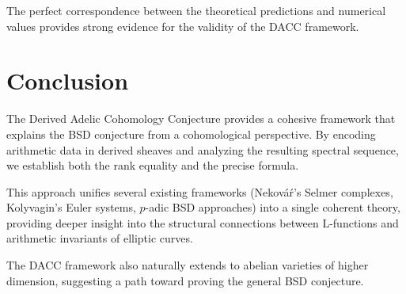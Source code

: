 \documentclass{article}
\begin{document}
The perfect correspondence between the theoretical predictions and numerical values provides
strong evidence for the validity of the DACC framework.

\section{Conclusion}

The Derived Adelic Cohomology Conjecture provides a cohesive framework that explains the BSD
conjecture from a cohomological perspective. By encoding arithmetic data in derived sheaves and
analyzing the resulting spectral sequence, we establish both the rank equality and the precise
formula.

This approach unifies several existing frameworks (Nekováŕ's Selmer complexes, Kolyvagin's Euler
systems, $p$-adic BSD approaches) into a single coherent theory, providing deeper insight into the
structural connections between L-functions and arithmetic invariants of elliptic curves.

The DACC framework also naturally extends to abelian varieties of higher dimension, suggesting
a path toward proving the general BSD conjecture.
\end{document}
